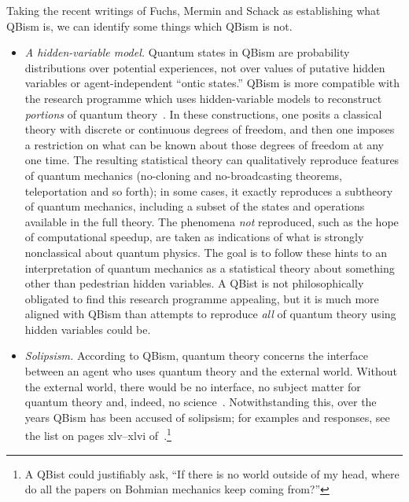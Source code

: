 \documentclass[aps,pra,superscriptaddress,12pt,tightenlines,nofootinbib]{revtex4-2}
\begin{document}
Taking the recent writings of Fuchs, Mermin and Schack as establishing
what QBism is, we can identify some things which QBism is not.  
\begin{itemize}
\item \emph{A hidden-variable model.}  Quantum states in QBism are
  probability distributions over potential experiences, not over
  values of putative hidden variables or agent-independent ``ontic
  states.''  QBism is more compatible with the research programme
  which uses hidden-variable models to reconstruct \emph{portions} of
  quantum theory~\cite{Spekkens2007, VanEnk2007, Coecke2011,
    Coecke2011b, Bartlett2012, Spekkens2014, Ferrie2014b}.  In these
  constructions, one posits a classical theory with discrete or
  continuous degrees of freedom, and then one imposes a restriction on
  what can be known about those degrees of freedom at any one time.
  The resulting statistical theory can qualitatively reproduce
  features of quantum mechanics (no-cloning and no-broadcasting
  theorems, teleportation and so forth); in some cases, it exactly
  reproduces a subtheory of quantum mechanics, including a subset of
  the states and operations available in the full theory.  The
  phenomena \emph{not} reproduced, such as the hope of computational
  speedup, are taken as indications of what is strongly nonclassical
  about quantum physics.  The goal is to follow these hints to an
  interpretation of quantum mechanics as a statistical theory about
  something other than pedestrian hidden variables.  A QBist is not
  philosophically obligated to find this research programme appealing,
  but it is much more aligned with QBism than attempts to reproduce
  \emph{all} of quantum theory using hidden variables could be.

\item \emph{Solipsism.}  According to QBism, quantum theory concerns
  the interface between an agent who uses quantum theory and the
  external world.  Without the external world, there would be no
  interface, no subject matter for quantum theory and, indeed, no
  science~\cite{RMP, Mermin-Bell}.  Notwithstanding this, over the
  years QBism has been accused of solipsism; for examples and
  responses, see the list on pages xlv--xlvi
  of~\cite{Fuchs2014}.\footnote{A QBist could justifiably ask, ``If
    there is no world outside of my head, where do all the papers on
    Bohmian mechanics keep coming from?''}


\end{itemize}
\end{document}
